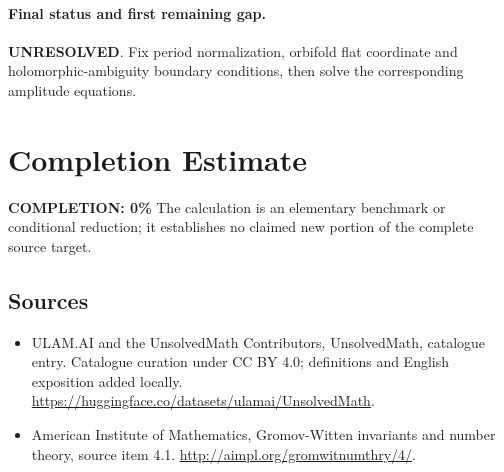 \documentclass[11pt]{article}
\begin{document}
\paragraph{Final status and first remaining gap.}
\textbf{UNRESOLVED}. Fix period normalization, orbifold flat coordinate and holomorphic-ambiguity boundary conditions, then solve the corresponding amplitude equations.

\section{Completion Estimate}
\noindent\textbf{COMPLETION: 0\%}
The calculation is an elementary benchmark or conditional reduction; it establishes no claimed new portion of the complete source target.

\subsection{Sources}
\begin{itemize}
\item[\hypertarget{source:statement:1}{S1}] ULAM.AI and the UnsolvedMath Contributors, UnsolvedMath, catalogue entry. Catalogue curation under CC BY 4.0; definitions and English exposition added locally.
\url{https://huggingface.co/datasets/ulamai/UnsolvedMath}.
\item[\hypertarget{source:statement:2}{S2}] American Institute of Mathematics, Gromov-Witten invariants and number theory, source item 4.1.
\url{http://aimpl.org/gromwitnumthry/4/}.
\end{itemize}
\label{end:statement}
\end{document}
